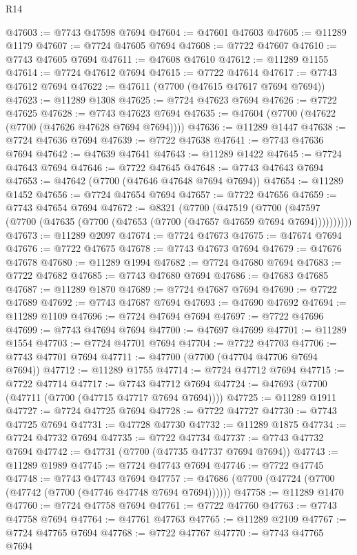 \begin{lexlean}{R14}
\begin{coremodule}
@47603 := @7743 @47598 @7694
@47604 := @47601 @47603
@47605 := @11289 @1179
@47607 := @7724 @47605 @7694
@47608 := @7722 @47607
@47610 := @7743 @47605 @7694
@47611 := @47608 @47610
@47612 := @11289 @1155
@47614 := @7724 @47612 @7694
@47615 := @7722 @47614
@47617 := @7743 @47612 @7694
@47622 := @47611 (@7700 (@47615 @47617 @7694 @7694))
@47623 := @11289 @1308
@47625 := @7724 @47623 @7694
@47626 := @7722 @47625
@47628 := @7743 @47623 @7694
@47635 := @47604 (@7700 (@47622 (@7700 (@47626 @47628 @7694 @7694))))
@47636 := @11289 @1447
@47638 := @7724 @47636 @7694
@47639 := @7722 @47638
@47641 := @7743 @47636 @7694
@47642 := @47639 @47641
@47643 := @11289 @1422
@47645 := @7724 @47643 @7694
@47646 := @7722 @47645
@47648 := @7743 @47643 @7694
@47653 := @47642 (@7700 (@47646 @47648 @7694 @7694))
@47654 := @11289 @1452
@47656 := @7724 @47654 @7694
@47657 := @7722 @47656
@47659 := @7743 @47654 @7694
@47672 := @8321
    (@7700
      (@47519
        (@7700 (@47597 (@7700 (@47635 (@7700 (@47653 (@7700 (@47657 @47659 @7694 @7694))))))))))
@47673 := @11289 @2097
@47674 := @7724 @47673
@47675 := @47674 @7694
@47676 := @7722 @47675
@47678 := @7743 @47673 @7694
@47679 := @47676 @47678
@47680 := @11289 @1994
@47682 := @7724 @47680 @7694
@47683 := @7722 @47682
@47685 := @7743 @47680 @7694
@47686 := @47683 @47685
@47687 := @11289 @1870
@47689 := @7724 @47687 @7694
@47690 := @7722 @47689
@47692 := @7743 @47687 @7694
@47693 := @47690 @47692
@47694 := @11289 @1109
@47696 := @7724 @47694 @7694
@47697 := @7722 @47696
@47699 := @7743 @47694 @7694
@47700 := @47697 @47699
@47701 := @11289 @1554
@47703 := @7724 @47701 @7694
@47704 := @7722 @47703
@47706 := @7743 @47701 @7694
@47711 := @47700 (@7700 (@47704 @47706 @7694 @7694))
@47712 := @11289 @1755
@47714 := @7724 @47712 @7694
@47715 := @7722 @47714
@47717 := @7743 @47712 @7694
@47724 := @47693 (@7700 (@47711 (@7700 (@47715 @47717 @7694 @7694))))
@47725 := @11289 @1911
@47727 := @7724 @47725 @7694
@47728 := @7722 @47727
@47730 := @7743 @47725 @7694
@47731 := @47728 @47730
@47732 := @11289 @1875
@47734 := @7724 @47732 @7694
@47735 := @7722 @47734
@47737 := @7743 @47732 @7694
@47742 := @47731 (@7700 (@47735 @47737 @7694 @7694))
@47743 := @11289 @1989
@47745 := @7724 @47743 @7694
@47746 := @7722 @47745
@47748 := @7743 @47743 @7694
@47757 := @47686 (@7700 (@47724 (@7700 (@47742 (@7700 (@47746 @47748 @7694 @7694))))))
@47758 := @11289 @1470
@47760 := @7724 @47758 @7694
@47761 := @7722 @47760
@47763 := @7743 @47758 @7694
@47764 := @47761 @47763
@47765 := @11289 @2109
@47767 := @7724 @47765 @7694
@47768 := @7722 @47767
@47770 := @7743 @47765 @7694

\end{coremodule}
\end{lexlean}
